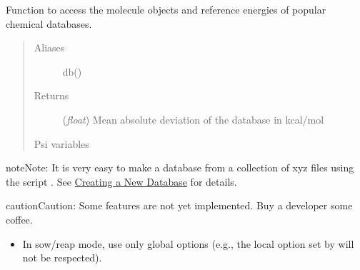 \documentclass[letterpaper,10pt,english]{sphinxmanual}
\begin{document}
\begin{fulllineitems}
\label{index:wrappers.database}
Function to access the molecule objects and reference energies of
popular chemical databases.
\begin{quote}\begin{description}
\item[{Aliases }] \leavevmode
db()

\item[{Returns}] \leavevmode
(\emph{float}) Mean absolute deviation of the database in kcal/mol

\item[{Psi variables}] \leavevmode
\end{description}\end{quote}

\begin{fulllineitems}
\label{index:envvar-db_nameDATABASEMEANSIGNEDDEVIATION}\label{index:envvar-db_nameDATABASEMEANABSOLUTEDEVIATION}\label{index:envvar-db_nameDATABASEROOT-MEAN-SQUAREDEVIATION}
\end{fulllineitems}


\begin{notice}{note}{Note:}
It is very easy to make a database from a collection of xyz files
using the script .
See {\hyperref[index:creating-a-new-database]{Creating a New Database}} for details.
\end{notice}

\begin{notice}{caution}{Caution:}
Some features are not yet implemented. Buy a developer some coffee.
\begin{itemize}
\item {} 
In sow/reap mode, use only global options (e.g., the local option set by  will not be respected).


\end{itemize}
\end{notice}
\end{fulllineitems}
\end{document}
